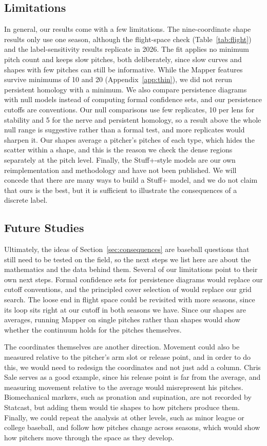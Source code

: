 \documentclass[11pt]{article}
\theoremstyle{definition}
\theoremstyle{remark}
\begin{document}
\subsection{Limitations}\label{sec:limits}
In general, our results come with a few limitations.
The nine-coordinate shape results only use one season, although the flight-space check (Table~\ref{tab:flight}) and the label-sensitivity results replicate in 2026.
The fit applies no minimum pitch count and keeps slow pitches, both deliberately, since slow curves and shapes with few pitches can still be informative.
While the Mapper features survive minimums of 10 and 20 (Appendix~\ref{app:thin}), we did not rerun persistent homology with a minimum.
We also compare persistence diagrams with null models instead of computing formal confidence sets, and our persistence cutoffs are conventions.
Our null comparisons use few replicates, 10 per lens for stability and 5 for the nerve and persistent homology, so a result above the whole null range is suggestive rather than a formal test, and more replicates would sharpen it.
Our shapes average a pitcher's pitches of each type, which hides the scatter within a shape, and this is the reason we check the dense regions separately at the pitch level.
Finally, the Stuff+-style models are our own reimplementation and methodology and have not been published. We will concede that there are many ways to build a Stuff+ model, and we do not claim that ours is the best, but it is sufficient to illustrate the consequences of a discrete label.

\subsection{Future Studies}
Ultimately, the ideas of Section~\ref{sec:consequences} are baseball questions that still need to be tested on the field, so the next steps we list here are about the mathematics and the data behind them.
Several of our limitations point to their own next steps.
Formal confidence sets for persistence diagrams \parencite{fasy2014confidence} would replace our cutoff conventions, and the principled cover selection of \textcite{carrieremicheloudot2018} would replace our grid search.
The loose end in flight space could be revisited with more seasons, since its loop sits right at our cutoff in both seasons we have.
Since our shapes are averages, running Mapper on single pitches rather than shapes would show whether the continuum holds for the pitches themselves.

The coordinates themselves are another direction.
Movement could also be measured relative to the pitcher's arm slot or release point, and in order to do this, we would need to redesign the coordinates and not just add a column.
Chris Sale serves as a good example, since his release point is far from the average, and measuring movement relative to the average would misrepresent his pitches.
Biomechanical markers, such as pronation and supination, are not recorded by Statcast, but adding them would tie shapes to how pitchers produce them.
Finally, we could repeat the analysis at other levels, such as minor league or college baseball, and follow how pitches change across seasons, which would show how pitchers move through the space as they develop.
\end{document}
